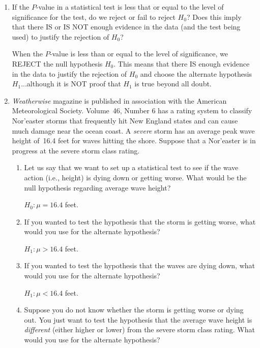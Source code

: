 \begin{enumerate}



\item If the $P$-value in a statistical test is less that or equal to the level of significance for the test, do we reject or fail to reject $H_0$? Does this imply that there IS or IS NOT enough evidence in the data (and the test being used) to justify the rejection of $H_0$? 

	{\answer When the $P$-value is less than or equal to the level of significance, we REJECT the null hypothesis $H_0$. 
	This means that there IS enough evidence in the data to justify the rejection of $H_0$ and choose the alternate hypothesis $H_1$...although it is NOT proof that $H_1$ is true beyond all doubt.}
	 
\vfill


\item {\it Weatherwise} magazine is published in association with the American Meteorological Society. Volume~46, Number 6 has a rating system to classify Nor'easter storms that frequently hit New England states and can cause much damage near the ocean coast. A {\it severe} storm has an average peak wave height of~16.4 feet for waves hitting the shore. Suppose that a Nor'easter is in progress at the severe storm class rating.
	\begin{enumerate}
	\item Let us say that we want to set up a statistical test to see if the wave action (i.e., height) is dying down or getting worse. What would be the null hypothesis regarding average wave height? 
	
	{\answer $H_0 : \mu = 16.4$ feet.} 
	 
	
	\item If you wanted to test the hypothesis that the storm is getting worse, what would you use for the alternate hypothesis? 
	
	{\answer $H_1: \mu > 16.4$ feet.}
	 
	
	\item If you wanted to test the hypothesis that the waves are dying down, what would you use for the alternate hypothesis? 
	
	{\answer $H_1: \mu < 16.4$ feet.} 
	 
	
	\item Suppose you do not know whether the storm is getting worse or dying out. You just want to test the hypothesis that the average wave height is {\it different} (either higher or lower) from the severe storm class rating. What would you use for the alternate hypothesis? 
	

\end{enumerate}
\end{enumerate}
